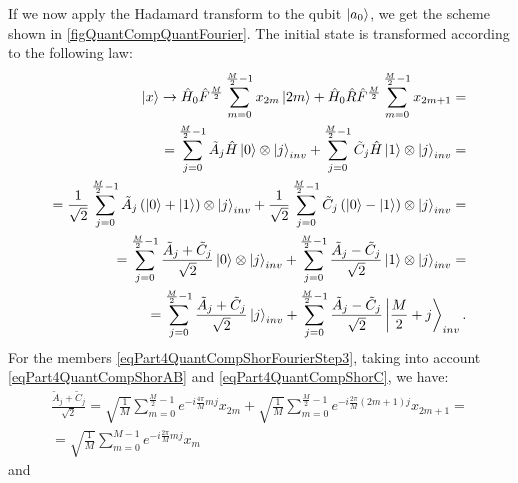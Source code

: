 

If we now apply the Hadamard transform  to the qubit $\ket{a_0}$, we get the scheme shown in \autoref{figQuantCompQuantFourier}. The initial state is transformed according to the following law:
\begin{eqnarray}
\ket{x} \rightarrow
\hat{H}_0\hat{F}^{\frac{M}{2}} \sum_{m = 0}^{\frac{M}{2} - 1}x_{2m} \ket{2m} +
\hat{H}_0\hat{R}\hat{F}^{\frac{M}{2}}\sum_{m = 0}^{\frac{M}{2} - 1} x_{2m + 1} =
\nonumber \\
=
\sum_{j = 0}^{\frac{M}{2} - 1}
\tilde{A}_{j}
\hat{H}\ket{0} \otimes \ket{j}_{inv}
+
\sum_{j = 0}^{\frac{M}{2} - 1} 
\tilde{C}_{j}
\hat{H}\ket{1} \otimes \ket{j}_{inv} 
=
\nonumber \\
= 
\frac{1}{\sqrt{2}}\sum_{j = 0}^{\frac{M}{2} - 1}
\tilde{A}_{j} 
\left(\ket{0} + \ket{1} \right) \otimes  
\ket{j}_{inv}
+
\frac{1}{\sqrt{2}}\sum_{j = 0}^{\frac{M}{2} - 1}
\tilde{C}_{j} 
\left(\ket{0} - \ket{1} \right) \otimes  
\ket{j}_{inv}
=
\nonumber \\
=
\sum_{j = 0}^{\frac{M}{2} - 1}
\frac{\tilde{A}_{j} + \tilde{C}_{j} }{\sqrt{2}} 
\ket{0} \otimes \ket{j}_{inv} +
\sum_{j = 0}^{\frac{M}{2} - 1}
\frac{ \tilde{A}_{j} - \tilde{C}_{j}}{\sqrt{2}} 
\ket{1} \otimes \ket{j}_{inv}
=
\nonumber \\
=
\sum_{j = 0}^{\frac{M}{2} - 1}
\frac{\tilde{A}_{j} + \tilde{C}_{j} }{\sqrt{2}} \ket{j}_{inv} +
\sum_{j = 0}^{\frac{M}{2} - 1}
\frac{ \tilde{A}_{j} - \tilde{C}_{j}}{\sqrt{2}} 
\left|\frac{M}{2} + j \right>_{inv}.
\label{eqPart4QuantCompShorFourierStep3}
\end{eqnarray}
For the members \eqref{eqPart4QuantCompShorFourierStep3}, taking into account \eqref{eqPart4QuantCompShorAB} and \eqref{eqPart4QuantCompShorC}, we have:
\begin{eqnarray}
\frac{\tilde{A}_{j} + \tilde{C}_{j} }{\sqrt{2}} = 
\sqrt{\frac{1}{M}} 
\sum_{m = 0}^{\frac{M}{2} - 1} e^{-i \frac{4 \pi}{M} m j} x_{2m}  +
\sqrt{\frac{1}{M}} 
\sum_{m = 0}^{\frac{M}{2} - 1} 
e^{-i \frac{2 \pi}{M} \left(2m+1\right) j} x_{2m+1} = 
\nonumber \\
=
\sqrt{\frac{1}{M}} \sum_{m = 0}^{M - 1}
e^{-i \frac{2 \pi}{M} m j} x_{m}
\label{eqPart4QuantCompShorFourierStep3_1}
\end{eqnarray}
and
